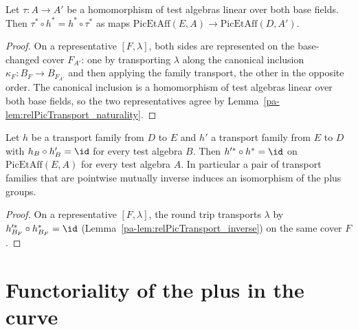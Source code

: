 \begin{theorem}
  \label{pa-thm:PicEtAffTransport_map}
  \leanok

  Let \(\tau \colon A \to A'\) be a homomorphism of test algebras linear over both base
  fields. Then \(\tau^{*} \circ h^{*} = h^{*} \circ \tau^{*}\) as maps
  \(\mathrm{PicEtAff}(E, A) \to \mathrm{PicEtAff}(D, A')\).
\end{theorem}
\begin{proof}
  \leanok
  On a representative \([F, \lambda]\), both sides are represented on the base-changed
  cover \(F_{A'}\): one by transporting \(\lambda\) along the canonical inclusion
  \(\kappa_F \colon B_F \to B_{F_{A'}}\) and then applying the family transport, the other
  in the opposite order. The canonical inclusion is a homomorphism of test algebras linear
  over both base fields, so the two representatives agree by
  Lemma~\ref{pa-lem:relPicTransport_naturality}.
\end{proof}

\begin{theorem}
  \label{pa-thm:PicEtAffTransport_inverse}
  \leanok

  Let \(h\) be a transport family from \(D\) to \(E\) and \(h'\) a transport family from
  \(E\) to \(D\) with \(h_B \circ h'_B = \id\) for every test algebra \(B\). Then
  \(h'^{*} \circ h^{*} = \id\) on \(\mathrm{PicEtAff}(E, A)\) for every test algebra
  \(A\). In particular a pair of transport families that are pointwise mutually inverse
  induces an isomorphism of the plus groups.
\end{theorem}
\begin{proof}
  \leanok
  On a representative \([F, \lambda]\), the round trip transports \(\lambda\) by
  \(h'^{*}_{B_F} \circ h_{B_F}^{*} = \id\) (Lemma~\ref{pa-lem:relPicTransport_inverse}) on the
  same cover \(F\).
\end{proof}

\section{Functoriality of the plus in the curve}


